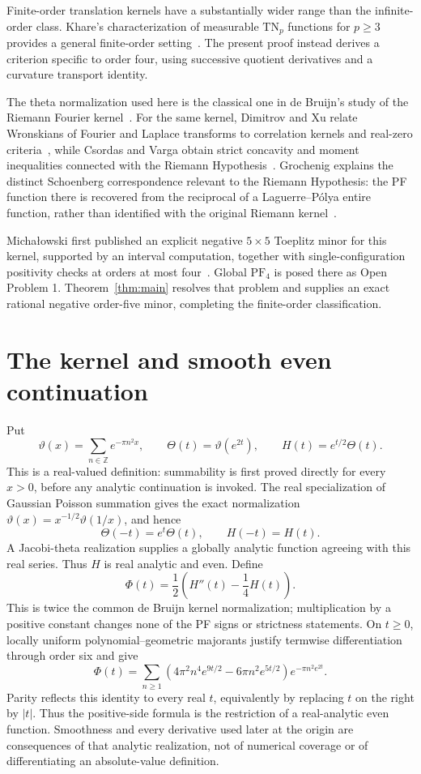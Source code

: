 \documentclass[11pt]{article}
\theoremstyle{remark}
\newcommand{\PF}{\mathrm{PF}}
\newcommand{\TN}{\mathrm{TN}}
\numberwithin{equation}{section}
\begin{document}
Finite-order translation kernels have a substantially wider range than the
infinite-order class. Khare's characterization of measurable \(\TN_p\)
functions for \(p\geq3\) provides a general finite-order setting~\cite{khare}.
The present proof instead derives a criterion specific to order four, using
successive quotient derivatives and a curvature transport identity.

The theta normalization used here is the classical one in de Bruijn's study of
the Riemann Fourier kernel~\cite{debruijn}. For the same kernel, Dimitrov and Xu
relate Wronskians of Fourier and Laplace transforms to correlation kernels and
real-zero criteria~\cite{dimitrov-xu}, while Csordas and Varga obtain strict
concavity and moment inequalities connected with the Riemann
Hypothesis~\cite{csordas-varga}. Grochenig explains the distinct Schoenberg
correspondence relevant to the Riemann Hypothesis: the PF function there is
recovered from the reciprocal of a Laguerre--P\'olya entire function, rather than
identified with the original Riemann kernel~\cite{grochenig}.

Micha\l{}owski first published an explicit negative \(5\times5\) Toeplitz
minor for this kernel, supported by an interval computation, together with
single-configuration positivity checks at orders at most
four~\cite{michalowski}. Global \(\PF_4\) is posed there as Open Problem 1.
Theorem~\ref{thm:main} resolves that problem and supplies an exact rational
negative order-five minor, completing the finite-order classification.
\section{The kernel and smooth even continuation}\label{sec:kernel}

Put
\[
 \vartheta(x)=\sum_{n\in\mathbb Z}e^{-\pi n^2x},\qquad
 \Theta(t)=\vartheta(e^{2t}),\qquad H(t)=e^{t/2}\Theta(t).
\]
This is a real-valued definition: summability is first proved directly for
every \(x>0\), before any analytic continuation is invoked. The real
specialization of Gaussian Poisson summation gives the exact normalization
\(\vartheta(x)=x^{-1/2}\vartheta(1/x)\), and hence
\[
 \Theta(-t)=e^t\Theta(t),\qquad H(-t)=H(t).
\]
A Jacobi-theta realization supplies a globally analytic function agreeing
with this real series. Thus \(H\) is real analytic and even. Define
\[
 \Phi(t)=\frac12\left(H''(t)-\frac14H(t)\right).
\]
This is twice the common de Bruijn kernel normalization; multiplication by a
positive constant changes none of the PF signs or strictness statements.
On \(t\geq0\), locally uniform polynomial--geometric majorants justify
termwise differentiation through order six and give
\begin{equation}\label{eq:kernel-series}
 \Phi(t)=\sum_{n\geq1}
 \left(4\pi^2n^4e^{9t/2}-6\pi n^2e^{5t/2}\right)
 e^{-\pi n^2e^{2t}}.
\end{equation}
Parity reflects this identity to every real \(t\), equivalently by replacing
\(t\) on the right by \(|t|\). Thus the positive-side formula is the
restriction of a real-analytic even function. Smoothness and every derivative
used later at the origin are consequences of that analytic realization, not
of numerical coverage or of differentiating an absolute-value definition.
\end{document}
